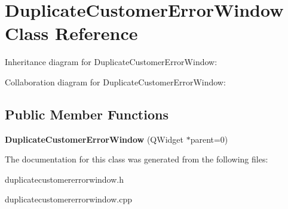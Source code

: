 \section{Duplicate\+Customer\+Error\+Window Class Reference}
\label{class_duplicate_customer_error_window}


Inheritance diagram for Duplicate\+Customer\+Error\+Window\+:


Collaboration diagram for Duplicate\+Customer\+Error\+Window\+:
\subsection*{Public Member Functions}
\begin{DoxyCompactItemize}
\item 
\mbox{\label{class_duplicate_customer_error_window_abd8b7224f0691c72e71f02d64764f037}} 
{\bfseries Duplicate\+Customer\+Error\+Window} (Q\+Widget $\ast$parent=0)
\end{DoxyCompactItemize}


The documentation for this class was generated from the following files\+:\begin{DoxyCompactItemize}
\item 
duplicatecustomererrorwindow.\+h\item 
duplicatecustomererrorwindow.\+cpp\end{DoxyCompactItemize}
